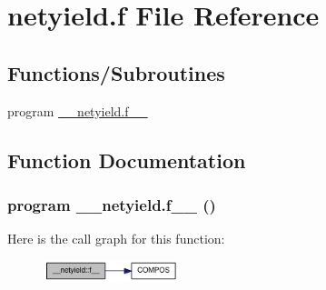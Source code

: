 \hypertarget{netyield_8f}{
\section{netyield.f File Reference}
\label{netyield_8f}
}
\subsection*{Functions/Subroutines}
\begin{DoxyCompactItemize}
\item 
program \hyperlink{netyield_8f_a9f3d89a4f651c00729d4461cfffd2263}{\_\-\_\-netyield.f\_\-\_\-}
\end{DoxyCompactItemize}


\subsection{Function Documentation}
\hypertarget{netyield_8f_a9f3d89a4f651c00729d4461cfffd2263}{
\subsubsection[{\_\-\_\-netyield.f\_\-\_\-}]{\setlength{\rightskip}{0pt plus 5cm}program \_\-\_\-netyield.f\_\-\_\- ()}}
\label{netyield_8f_a9f3d89a4f651c00729d4461cfffd2263}


Here is the call graph for this function:\nopagebreak
\begin{figure}[H]
\begin{center}
\leavevmode
\includegraphics[width=112pt]{netyield_8f_a9f3d89a4f651c00729d4461cfffd2263_cgraph}
\end{center}
\end{figure}
